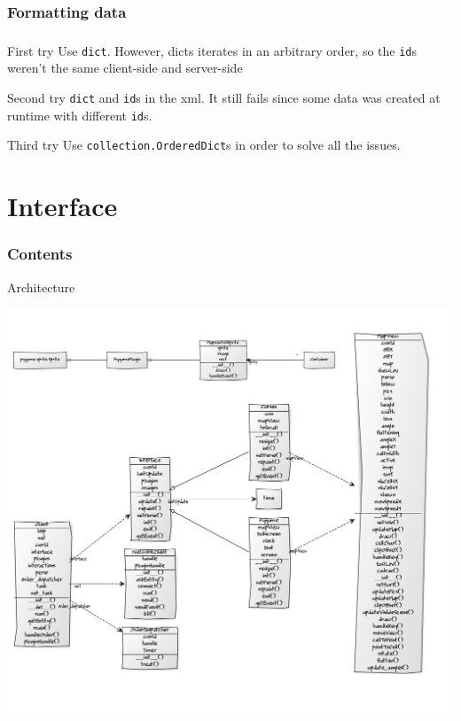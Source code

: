 \documentclass[11pt]{beamer}
\begin{document}
\subsubsection{Formatting data}

\begin{frame}[fragile]
    \frametitle{\subsecname}
    \begin{alertblock}{First try}
        Use \verb|dict|. However, dicts iterates in an arbitrary order,
        so the \verb|id|s weren't the same client-side and server-side
    \end{alertblock}

    \pause

    \begin{alertblock}{Second try}
        \verb|dict| and \verb|id|s in the xml. It still fails
        since some data was created at runtime with different \verb|id|s.
    \end{alertblock}

    \pause

    \begin{block}{Third try}
        Use \verb|collection.OrderedDict|s in order to solve
        all the issues.
    \end{block}
\end{frame}


\section{Interface}
    \begin{frame}
        \frametitle{Contents}
        \tableofcontents[currentsection]
    \end{frame}

\begin{frame}{Architecture}
	\begin{center}\includegraphics[scale=0.21]{uml_pygame.png}\end{center}
\end{frame}
\end{document}
